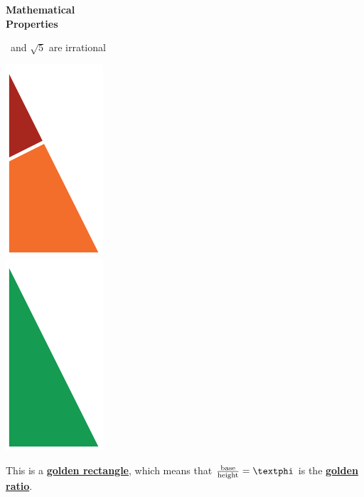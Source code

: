 \documentclass[14pt]{beamer}
\begin{document}

    \begin{frame}{}
        \begin{center}
            \textbf{\Huge Mathematical\\\bigskip Properties}\\
        \end{center}
    \end{frame}


    \begin{frame}{\textphi\ and $\sqrt{5}$ are irrational}
        \begin{center}
            \begin{minipage}{0.45\textwidth}%
                \includegraphics[scale=0.750]{figures/figure020a.pdf} \\[2ex]
                \includegraphics[scale=0.750]{figures/figure020b.pdf} \\
            \end{minipage}\hfill\begin{minipage}{0.5\textwidth}
                \footnotesize
                This is a \textbf{\href{https://en.wikipedia.org/wiki/Golden_rectangle}{golden rectangle}}, which means that $\tfrac{\text{base}}{\text{height}} = \text{\textphi}$ is the \textbf{\href{https://en.wikipedia.org/wiki/Golden_ratio}{golden ratio}}.\bigskip


\end{minipage}
\end{center}
\end{frame}
\end{document}

